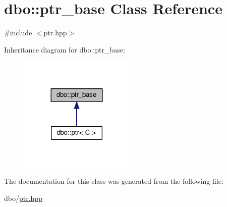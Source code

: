 \hypertarget{classdbo_1_1ptr__base}{\section{dbo\+:\+:ptr\+\_\+base Class Reference}
\label{classdbo_1_1ptr__base}
}


{\ttfamily \#include $<$ptr.\+hpp$>$}



Inheritance diagram for dbo\+:\+:ptr\+\_\+base\+:\nopagebreak
\begin{figure}[H]
\begin{center}
\leavevmode
\includegraphics[width=156pt]{classdbo_1_1ptr__base__inherit__graph}
\end{center}
\end{figure}


The documentation for this class was generated from the following file\+:\begin{DoxyCompactItemize}
\item 
dbo/\hyperlink{ptr_8hpp}{ptr.\+hpp}\end{DoxyCompactItemize}
